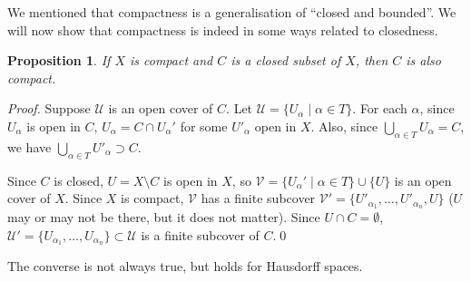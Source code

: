 \documentclass{article}
\theoremstyle{plain}\theoremheaderfont{\normalfont\itshape}\theorembodyfont{\rmfamily}\theoremseparator{.}\newtheorem*{rem}{Remark}\newtheorem*{ex}{Example}\newtheorem*{proof}{Proof}\newtheorem*{altp}{Alternative proof}
\theoremstyle{plain}\theoremheaderfont{\normalfont\bfseries}\theorembodyfont{\rmfamily}\theoremseparator{.}\newtheorem{thm}{Theorem}[section]\newtheorem{lem}[thm]{Lemma}\newtheorem{prop}[thm]{Proposition}\newtheorem*{cor}{Corollary}\newtheorem{defn}[thm]{Definition}\newtheorem{clm}[thm]{Claim}\newtheorem{clminproof}{Claim}
\theoremstyle{break}\theoremheaderfont{\normalfont\itshape}\theorembodyfont{\rmfamily}\theoremseparator{.\medskip}\newtheorem*{proofskip}{Proof}\newtheorem*{exs}{Examples}\newtheorem*{rems}{Remarks}
\theoremstyle{break}\theoremheaderfont{\normalfont\bfseries}\theorembodyfont{\rmfamily}\theoremseparator{.\medskip}\newtheorem{lemskip}[thm]{Lemma}\newtheorem{defnskip}[thm]{Definition}\newtheorem{propskip}[thm]{Proposition}\newtheorem{thmskip}[thm]{Theorem}
\newcommand{\qed}{\hfill\ensuremath{\Box}}
\begin{document}
    We mentioned that compactness is a generalisation of ``closed and bounded”. We will now show that compactness is indeed in some ways related to closedness.

    \begin{prop}
        If \(X\) is compact and \(C\) is a closed subset of \(X\), then \(C\) is also compact.
    \end{prop}
    \begin{proof}
        Suppose \(\mathscr{U}\) is an open cover of \(C\). Let \(\mathscr{U}=\{U_\alpha\mid\alpha\in T\}\). For each \(\alpha\), since \(U_\alpha\) is open in \(C\), \(U_\alpha=C\cap U_\alpha'\) for some \(U'_\alpha\) open in \(X\). Also, since \(\bigcup_{\alpha\in T} U_\alpha =C\), we have \(\bigcup_{\alpha\in T}U'_\alpha\supset C\).

        Since \(C\) is closed, \(U=X\setminus C\) is open in \(X\), so \(\mathscr{V}=\{U_\alpha'\mid\alpha\in T\}\cup\{U\}\) is an open cover of \(X\). Since \(X\) is compact, \(\mathscr{V}\) has a finite subcover \(\mathscr{V}'=\{U'_{\alpha_1},\dots,U'_{\alpha_n},U\}\) (\(U\) may or may not be there, but it does not matter). Since \(U\cap C=\emptyset\), \(\mathscr{U}'=\{U_{\alpha_1},\dots,U_{\alpha_n}\}\subset\mathscr{U}\) is a finite subcover of \(C\).\qed
    \end{proof}

    The converse is not always true, but holds for Hausdorff spaces.
\end{document}
